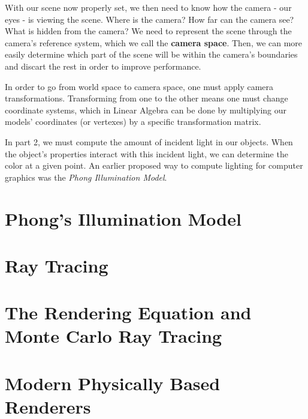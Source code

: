 With our scene now properly set, we then need to know how the camera - our eyes - is viewing the scene. Where is the camera? How far can the camera see? What is hidden from the camera? We need to represent the scene through the camera's reference system, which we call the \textbf{camera space}. Then, we can more easily determine which part of the scene will be within the camera's boundaries and discart the rest in order to improve performance.

In order to go from world space to camera space, one must apply camera transformations. Transforming from one to the other means one must change coordinate systems, which in Linear Algebra can be done by multiplying our models' coordinates (or vertexes) by a specific transformation matrix. 

In part 2, we must compute the amount of incident light in our objects. When the object's properties interact with this incident light, we can determine the color at a given point. An earlier proposed way to compute lighting for computer graphics was the \textit{Phong Illumination Model}.

\section{Phong's Illumination Model}



\section{Ray Tracing}

\section{The Rendering Equation and Monte Carlo Ray Tracing}

\section{Modern Physically Based Renderers}


